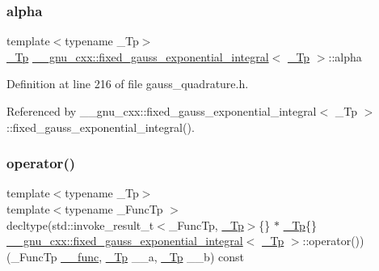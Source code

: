 \subsubsection{\texorpdfstring{alpha}{alpha}}
{\footnotesize\ttfamily template$<$typename \+\_\+\+Tp$>$ \\
\hyperlink{namespace____gnu__cxx_a3b19a9c800ca194374ef9172290f7d79}{\+\_\+\+Tp} \hyperlink{struct____gnu__cxx_1_1fixed__gauss__exponential__integral}{\+\_\+\+\_\+gnu\+\_\+cxx\+::fixed\+\_\+gauss\+\_\+exponential\+\_\+integral}$<$ \hyperlink{namespace____gnu__cxx_a3b19a9c800ca194374ef9172290f7d79}{\+\_\+\+Tp} $>$\+::alpha}



Definition at line 216 of file gauss\+\_\+quadrature.\+h.



Referenced by \+\_\+\+\_\+gnu\+\_\+cxx\+::fixed\+\_\+gauss\+\_\+exponential\+\_\+integral$<$ \+\_\+\+Tp $>$\+::fixed\+\_\+gauss\+\_\+exponential\+\_\+integral().

\mbox{\label{struct____gnu__cxx_1_1fixed__gauss__exponential__integral_afe5fe800ebaaf8e6a97034a6c4a17b1e}} 
\subsubsection{\texorpdfstring{operator()}{operator()}}
{\footnotesize\ttfamily template$<$typename \+\_\+\+Tp$>$ \\
template$<$typename \+\_\+\+Func\+Tp $>$ \\
decltype(std\+::invoke\+\_\+result\+\_\+t$<$\+\_\+\+Func\+Tp, \hyperlink{namespace____gnu__cxx_a3b19a9c800ca194374ef9172290f7d79}{\+\_\+\+Tp}$>$\{\} $\ast$ \hyperlink{namespace____gnu__cxx_a3b19a9c800ca194374ef9172290f7d79}{\+\_\+\+Tp}\{\} \hyperlink{struct____gnu__cxx_1_1fixed__gauss__exponential__integral}{\+\_\+\+\_\+gnu\+\_\+cxx\+::fixed\+\_\+gauss\+\_\+exponential\+\_\+integral}$<$ \hyperlink{namespace____gnu__cxx_a3b19a9c800ca194374ef9172290f7d79}{\+\_\+\+Tp} $>$\+::operator()) (\+\_\+\+Func\+Tp \hyperlink{namespace____gnu__cxx_af2b2f0c7a2ae72b922b1afefae5a65b2}{\+\_\+\+\_\+func}, \hyperlink{namespace____gnu__cxx_a3b19a9c800ca194374ef9172290f7d79}{\+\_\+\+Tp} \+\_\+\+\_\+a, \hyperlink{namespace____gnu__cxx_a3b19a9c800ca194374ef9172290f7d79}{\+\_\+\+Tp} \+\_\+\+\_\+b) const}



